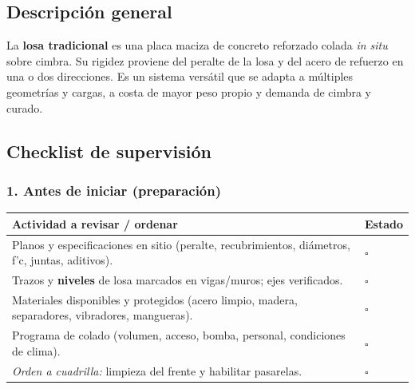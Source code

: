 \documentclass[12pt]{article}
\newcommand{\cbox}{\(\square\)} %
\begin{document}
 \subsection*{Descripción general}
 La \textbf{losa tradicional} es una placa maciza de concreto reforzado colada \emph{in situ} sobre cimbra. Su rigidez proviene del peralte de la losa y del acero de refuerzo en una o dos direcciones. Es un sistema versátil que se adapta a múltiples geometrías y cargas, a costa de mayor peso propio y demanda de cimbra y curado.
 
 
 
 \subsection{Checklist de supervisión}
 
 \subsubsection*{1. Antes de iniciar (preparación)}
 \begin{tabularx}{\linewidth}{>{\raggedright\arraybackslash}p{0.93\linewidth} >{\centering\arraybackslash}m{0.07\linewidth}}
 	\toprule
 	\textbf{Actividad a revisar / ordenar} & \textbf{Estado}\\
 	\midrule
 	Planos y especificaciones en sitio (peralte, recubrimientos, diámetros, f'c, juntas, aditivos). & \cbox \\
 	Trazos y \textbf{niveles} de losa marcados en vigas/muros; ejes verificados. & \cbox \\
 	Materiales disponibles y protegidos (acero limpio, madera, separadores, vibradores, mangueras). & \cbox \\
 	Programa de colado (volumen, acceso, bomba, personal, condiciones de clima). & \cbox \\
 	\textit{Orden a cuadrilla:} limpieza del frente y habilitar pasarelas. & \cbox \\
 	\bottomrule
 \end{tabularx}
 
\end{document}

